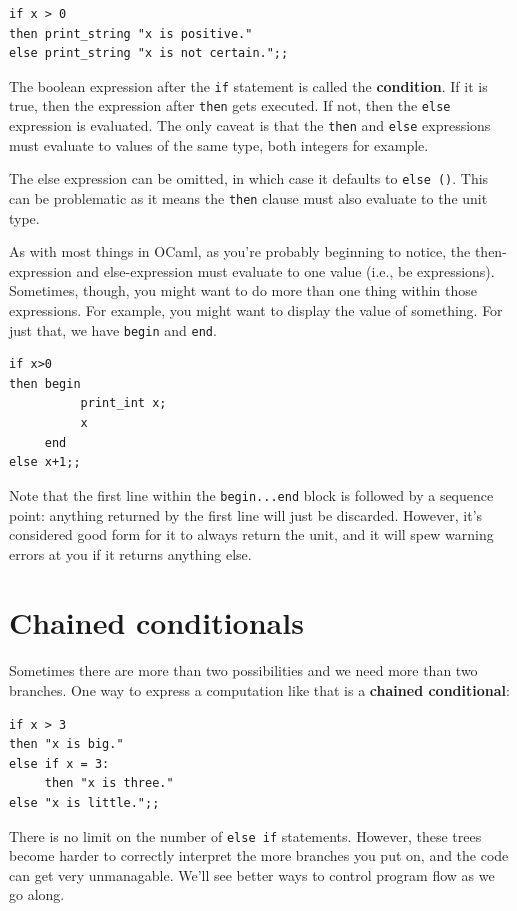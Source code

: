 \documentclass[10pt]{book}
\begin{document}
\beforeverb
\begin{verbatim}
if x > 0
then print_string "x is positive."
else print_string "x is not certain.";;
\end{verbatim}
\afterverb

The boolean expression after the {\tt if} statement is
called the {\bf condition}.  If it is true, then the expression 
after {\tt then} gets executed.  If not, then the {\tt else} expression 
is evaluated. The only caveat is that the {\tt then} and {\tt else} expressions
must evaluate to values of the same type, both integers for example.

The else expression can be omitted, in which case it defaults
to {\tt else ()}. This can be problematic as it means the {\tt then} clause must
also evaluate to the unit type.

As with most things in OCaml, as you're probably beginning to notice, the 
then-expression and else-expression must evaluate to one value (i.e., be expressions).
Sometimes, though, you might want to do more than one thing within those expressions.
For example, you might want to display the value of something. For just that, we have 
{\tt begin} and {\tt end}.

\beforeverb
\begin{verbatim}
if x>0
then begin
          print_int x;
          x
     end
else x+1;;
\end{verbatim}
\afterverb

Note that the first line within the {\tt begin...end} block is followed by a sequence point:
anything returned by the first line will just be discarded. However, it's considered good form
for it to always return the unit, and it will spew warning errors at you if it returns anything
else.

\section{Chained conditionals}

Sometimes there are more than two possibilities and we need more than
two branches.  One way to express a computation like that is a {\bf
chained conditional}:

\beforeverb
\begin{verbatim}
if x > 3
then "x is big."
else if x = 3:
     then "x is three."
else "x is little.";;
\end{verbatim}
\afterverb
%
There is no limit on the number of {\tt else if} statements. However, these
trees become harder to correctly interpret the more branches you put on, and
the code can get very unmanagable. We'll see better ways to control program 
flow as we go along.
\end{document}
